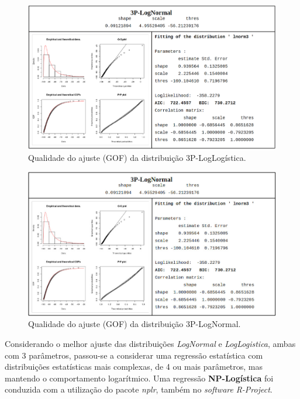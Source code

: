 \documentclass[
	12pt,				%
	twoside,			%
	a4paper,			%
	english,			%
	french,				%
	spanish,			%
	brazil				%
	]{abntex2}
\begin{document}
\begin{figure}[htb]
    \caption{\label{log_logistica} Qualidade do ajuste (GOF) da distribuição 3P-LogLogística.}
    \begin{center}
        \includegraphics[scale=0.3]{imagens/log-logistica.png}
    \end{center}
\end{figure}
\begin{figure}[htb]
    \caption{\label{log_normal} Qualidade do ajuste (GOF) da distribuição 3P-LogNormal.}
    \begin{center}
        \includegraphics[scale=0.47]{imagens/log-normal.jpg}
    \end{center}
\end{figure}

Considerando o melhor ajuste das distribuições \emph{LogNormal} e
\emph{LogLogistica}, ambas com 3 parâmetros, passou-se a considerar uma
regressão estatística com distribuições estatísticas mais complexas, de
4 ou mais parâmetros, mas mantendo o comportamento logarítmico. Uma
regressão \textbf{NP-Logística} foi conduzida com a utilização do pacote
\emph{nplr}, também no \emph{software} \emph{R-Project}.
\end{document}
